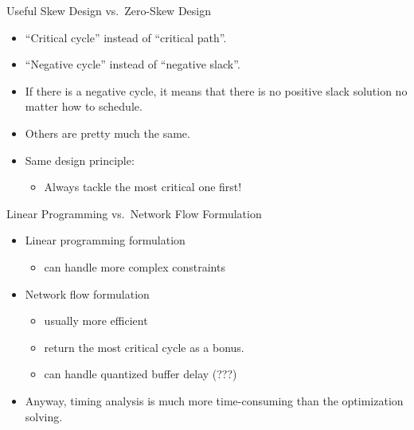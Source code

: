 \documentclass[10pt,ignorenonframetext,mathserif]{beamer}
\providecommand{\tightlist}{%
  \setlength{\itemsep}{0pt}\setlength{\parskip}{0pt}}
\begin{document}
\begin{frame}{Useful Skew Design vs.~Zero-Skew Design}

\begin{itemize}
\tightlist
\item
  ``Critical cycle'' instead of ``critical path''.
\item
  ``Negative cycle'' instead of ``negative slack''.
\item
  If there is a negative cycle, it means that there is no positive slack
  solution no matter how to schedule.
\item
  Others are pretty much the same.
\item
  Same design principle:

  \begin{itemize}
  \tightlist
  \item
    Always tackle the most critical one first!
  \end{itemize}
\end{itemize}

\end{frame}

\begin{frame}{Linear Programming vs.~Network Flow Formulation}

\begin{itemize}
\tightlist
\item
  Linear programming formulation

  \begin{itemize}
  \tightlist
  \item
    can handle more complex constraints
  \end{itemize}
\item
  Network flow formulation

  \begin{itemize}
  \tightlist
  \item
    usually more efficient
  \item
    return the most critical cycle as a bonus.
  \item
    can handle quantized buffer delay (???)
  \end{itemize}
\item
  Anyway, timing analysis is much more time-consuming than the
  optimization solving.
\end{itemize}

\end{frame}
\end{document}
